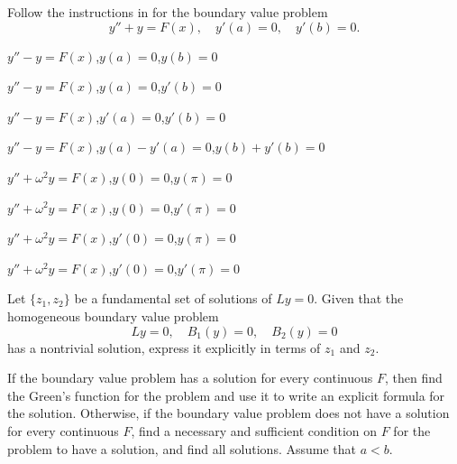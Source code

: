 \begin{exerciselist}
\item\label{exer:13.1.11}Follow the instructions in  for the boundary value
problem
\[
y''+y=F(x),\quad y'(a)=0,\quad y'(b)=0.
\]


\item\label{exer:13.1.12}$y''-y=F(x)$,\quad  $y(a)=0$,\quad  $y(b)=0$

\item\label{exer:13.1.13}$y''-y=F(x)$,\quad  $y(a)=0$,\quad  $y'(b)=0$

\item\label{exer:13.1.14}$y''-y=F(x)$,\quad  $y'(a)=0$,\quad  $y'(b)=0$

\item\label{exer:13.1.15}$y''-y=F(x)$,\quad  $y(a)-y'(a)=0$,\quad  $y(b)+y'(b)=0$


\item\label{exer:13.1.16}$y''+ \omega^{2}y=F(x)$,\quad $y(0)=0$,\quad $y(\pi)=0$

\item\label{exer:13.1.17}$y''+ \omega^{2}y=F(x)$,\quad $y(0)=0$,\quad $y'(\pi)=0$

\item\label{exer:13.1.18}$y''+ \omega^{2}y=F(x)$,\quad $y'(0)=0$,\quad $y(\pi)=0$

\item\label{exer:13.1.19}$y''+ \omega^{2}y=F(x)$,\quad $y'(0)=0$,\quad $y'(\pi)=0$

\item\label{exer:13.1.20}Let $\{z_{1},z_{2}\}$ be a fundamental set of solutions of $Ly=0$.
Given that the homogeneous boundary value problem
\[
Ly=0, \quad B_{1}(y)=0,\quad B_{2}(y)=0
\]
has a nontrivial solution, express it explicitly in terms of $z_{1}$
and $z_{2}$.

\item\label{exer:13.1.21}If the boundary value problem has a solution for every continuous  $F$,
then find  the Green's function
for the problem and use it to write
an explicit formula for the solution. Otherwise, if the
boundary value problem does not have a solution for every continuous $F$,
find a necessary and sufficient condition on $F$ for the problem to have
a solution, and find all solutions. Assume that $a<b$.


\end{exerciselist}
